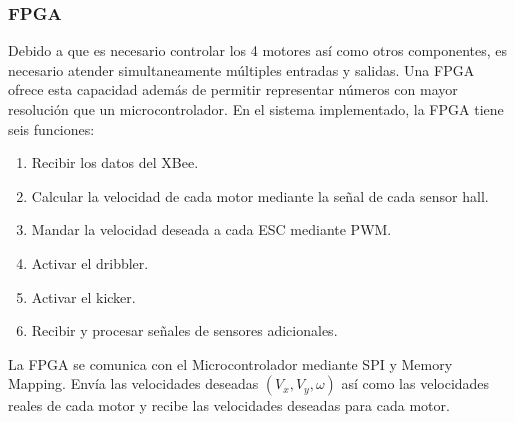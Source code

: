 \documentclass[twocolumn,10pt]{amrob}
\begin{document}

\subsubsection*{FPGA}
\label{sec:fpga}
Debido a que es necesario controlar los 4 motores así como otros componentes, es necesario atender simultaneamente múltiples entradas y salidas. Una FPGA ofrece esta capacidad además de permitir representar números con mayor resolución que un microcontrolador. En el sistema implementado, la FPGA tiene seis funciones:
\begin{enumerate}
  \item Recibir los datos del XBee.
  \item Calcular la velocidad de cada motor mediante la señal de cada sensor hall.
  \item Mandar la velocidad deseada a cada ESC mediante PWM.
  \item Activar el dribbler.
  \item Activar el kicker.
  \item Recibir y procesar señales de sensores adicionales.
\end{enumerate}
La FPGA se comunica con el Microcontrolador mediante SPI y Memory Mapping. Envía las velocidades deseadas $(V_x,V_y,\omega)$ así como las velocidades reales de cada motor y recibe las velocidades deseadas para cada motor.\par

\end{document}
